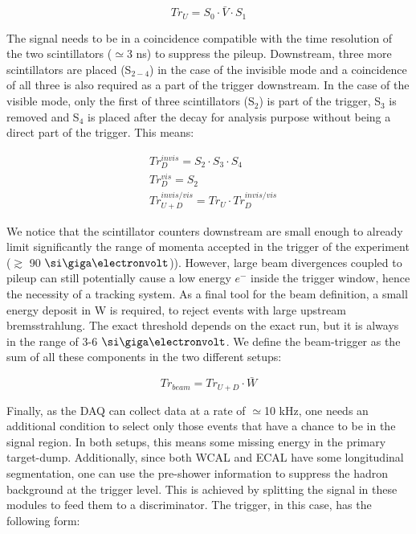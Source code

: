 \begin{equation}
\label{eq:trigger-upstream}
Tr_U = S_0 \cdot \bar{V} \cdot S_1
\end{equation}

The signal needs to be in a coincidence compatible with the time resolution of the two scintillators ($\simeq$3 \si{ns}) to suppress the pileup. Downstream, three more scintillators are placed (S$_{2-4}$) in the case of the invisible mode and a coincidence of all three is also required as a part of the trigger downstream. In the case of the visible mode, only the first of three scintillators (S$_2$) is part of the trigger, S$_3$ is removed and S$_4$ is placed after the decay for analysis purpose without being a direct part of the trigger. This means:

\begin{equation}
\label{eq:trigger-downstream}
\begin{split}      
& Tr^{invis}_D = S_2 \cdot S_3 \cdot S_4 \\
& Tr^{vis}_D = S_2 \\
& Tr^{invis/vis}_{U+D} = Tr_U \cdot Tr^{invis/vis}_D
\end{split}
\end{equation}

We notice that the scintillator counters downstream are small enough to already limit significantly the range of momenta accepted in the trigger of the experiment ($\gtrsim$ 90 $\gev$)). However, large beam divergences coupled to pileup can still potentially cause a low energy $e^-$ inside the trigger window, hence the
necessity of a tracking system. As a final tool for the beam definition, a small energy deposit in W is required, to reject events with large upstream bremsstrahlung. The exact threshold depends on the exact run, but it is always in the range of 3-6 $\gev$. We define the beam-trigger as the sum of all these components in the two different setups:

\begin{equation}
\label{eq:trigger-beam}
Tr_{beam} = Tr_{U+D} \cdot \bar{W}
\end{equation}

Finally, as the DAQ can collect data at a rate of $\simeq$10 \si{kHz}, one needs an additional condition to select only those events that have a chance to be in the signal region. In both setups, this means some missing energy in the primary target-dump. Additionally, since both WCAL and ECAL have some longitudinal segmentation, one can use the pre-shower information to suppress the hadron background at the trigger level. This is achieved by splitting the signal in these modules to feed them to a discriminator. The trigger, in this case, has the following form:

